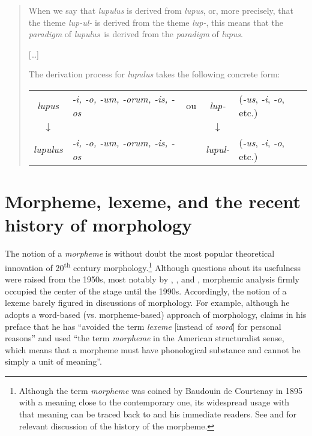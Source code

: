 \documentclass[output=paper]{langsci/langscibook}
\begin{document}
\begin{quote}
When we say that \emph{lupulus} is derived from \emph{lupus}, or, more
precisely, that the theme \emph{lup-ul-} is derived from the theme
\emph{lup-}, this means that the \emph{paradigm} of \emph{lupulus}~is
derived from the \emph{paradigm} of \emph{lupus}.

{[}\ldots{}{]}

The derivation process for \emph{lupulus} takes the following concrete
form:

\begin{center}
\begin{tabular}{cllcl}
\it lupus & \it -i, -o, -um, -orum, -is, -os &  ou & \it lup- & (\textit{-us}, \textit{-i}, \textit{-o}, etc.)\\
$\downarrow$ & & & $\downarrow$\\
\it lupulus & \it -i, -o, -um, -orum, -is, -os &   & \it lupul- & (\textit{-us},  
\textit{-i}, \textit{-o}, etc.)\\
\end{tabular}
\end{center}
\hfill \citep[p.~123; my translation]{Kurylowicz} 
\end{quote}

\clearpage 
\section{Morpheme, lexeme, and the recent history of morphology}

The notion of a \emph{morpheme} is without doubt the most popular
theoretical innovation of 20\textsuperscript{th} century
morphology.\footnote{Although the term \emph{morpheme} was coined by
  Baudouin de Courtenay in 1895 with a meaning close to the contemporary
  one, its widespread usage with that meaning can be traced back to
  \citet{Bloomfield1933} and his immediate readers. See \citet{Anderson15} and
  \citet{Blevins14} for relevant discussion of the history of the morpheme.}
Although questions about its usefulness were raised from the 1950s, most
notably by \citet{Hockett54, Hockett67}, \citet{Robins59}, \citet{Chomsky1965} and
\citet{Matthews65}, morphemic analysis firmly occupied the center of the
stage until the 1990s. Accordingly, the notion of a lexeme barely
figured in discussions of morphology. For example, although he adopts a
word-based (vs. morpheme-based) approach of morphology, \citet{Aronoff1976}
claims in his preface that he has ``avoided the term \emph{lexeme}
{[}instead of \emph{word}{]} for personal reasons'' and used ``the term
\emph{morpheme} in the American structuralist sense, which means that a
morpheme must have phonological substance and cannot be simply a unit of
meaning''.
\end{document}
